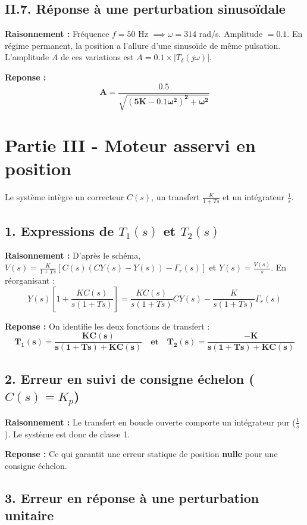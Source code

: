 \documentclass[11pt,a4paper]{article}
\begin{document}
\subsection*{II.7. Réponse à une perturbation sinusoïdale}

\textbf{Raisonnement :} Fréquence $f = 50$ Hz $\implies \omega = 314$ rad/s. Amplitude $= 0.1$. En régime permanent, la position a l'allure d'une sinusoïde de même pulsation. L'amplitude $A$ de ces variations est $A = 0.1 \times |T_\delta(j\omega)|$.

\textbf{Reponse :} 
$$ 
\mathbf{A = \frac{0.5}{\sqrt{(5K - 0.1\omega^2)^2 + \omega^2}}} 
$$

\hrulefill

\section*{Partie III - Moteur asservi en position}

Le système intègre un correcteur $C(s)$, un transfert $\frac{K}{1+Ts}$ et un intégrateur $\frac{1}{s}$.

\subsection*{1. Expressions de $T_1(s)$ et $T_2(s)$}

\textbf{Raisonnement :} D'après le schéma, $V(s) = \frac{K}{1+Ts}[C(s)(CY(s) - Y(s)) - \Gamma_r(s)]$ et $Y(s) = \frac{V(s)}{s}$. En réorganisant :
$$ 
Y(s) \left[ 1 + \frac{K C(s)}{s(1+Ts)} \right] = \frac{K C(s)}{s(1+Ts)} CY(s) - \frac{K}{s(1+Ts)} \Gamma_r(s) 
$$

\textbf{Reponse :} On identifie les deux fonctions de transfert :
$$ 
\mathbf{T_1(s) = \frac{K C(s)}{s(1+Ts) + K C(s)} \quad \text{et} \quad T_2(s) = \frac{-K}{s(1+Ts) + K C(s)}} 
$$

\subsection*{2. Erreur en suivi de consigne échelon ($C(s) = K_p$)}

\textbf{Raisonnement :} Le transfert en boucle ouverte comporte un intégrateur pur ($\frac{1}{s}$). Le système est donc de classe 1.

\textbf{Reponse :} Ce qui garantit une erreur statique de position \textbf{nulle} pour une consigne échelon.

\subsection*{3. Erreur en réponse à une perturbation unitaire}
\end{document}
